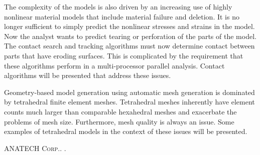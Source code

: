 The complexity of the models is also driven by an increasing use of highly nonlinear material models that include material failure and deletion. It is no longer sufficient to simply predict the nonlinear stresses and strains in the model. Now the analyst wants to predict tearing or perforation of the parts of the model. The contact search and tracking algorithms must now determine contact between parts that have eroding surfaces. This is complicated by the requirement that these algorithms perform in a multi-processor parallel analysis. Contact algorithms will be presented that address these issues.

Geometry-based model generation using automatic mesh generation is dominated by tetrahedral finite element meshes. Tetrahedral meshes inherently have element counts much larger than comparable hexahedral meshes and exacerbate the problems of mesh size. Furthermore, mesh quality is always an issue. Some examples of tetrahedral models in the context of these issues will be presented.


\begin{thebibliography}{1}
\textsc{ANATECH Corp.}.
.

\end{thebibliography}